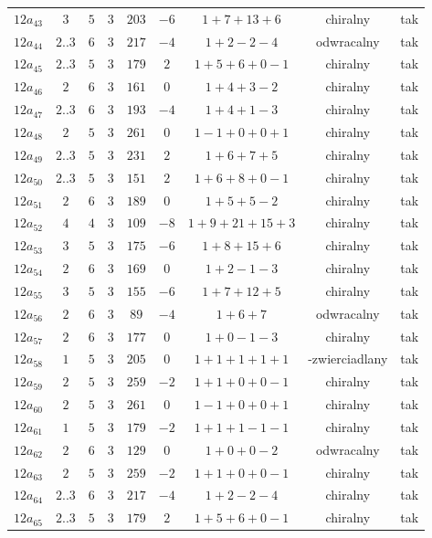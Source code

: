 \begin{longtable}{ccccccccc}
$12a_{43}$ & $3$ & $5$ & $3$ & $203$ & $-6$ & $1+7+13+6$ & chiralny & tak \\
$12a_{44}$ & $2..3$ & $6$ & $3$ & $217$ & $-4$ & $1+2-2-4$ & odwracalny & tak \\
$12a_{45}$ & $2..3$ & $5$ & $3$ & $179$ & $2$ & $1+5+6+0-1$ & chiralny & tak \\
$12a_{46}$ & $2$ & $6$ & $3$ & $161$ & $0$ & $1+4+3-2$ & chiralny & tak \\
$12a_{47}$ & $2..3$ & $6$ & $3$ & $193$ & $-4$ & $1+4+1-3$ & chiralny & tak \\
$12a_{48}$ & $2$ & $5$ & $3$ & $261$ & $0$ & $1-1+0+0+1$ & chiralny & tak \\
$12a_{49}$ & $2..3$ & $5$ & $3$ & $231$ & $2$ & $1+6+7+5$ & chiralny & tak \\
$12a_{50}$ & $2..3$ & $5$ & $3$ & $151$ & $2$ & $1+6+8+0-1$ & chiralny & tak \\
$12a_{51}$ & $2$ & $6$ & $3$ & $189$ & $0$ & $1+5+5-2$ & chiralny & tak \\
$12a_{52}$ & $4$ & $4$ & $3$ & $109$ & $-8$ & $1+9+21+15+3$ & chiralny & tak \\
$12a_{53}$ & $3$ & $5$ & $3$ & $175$ & $-6$ & $1+8+15+6$ & chiralny & tak \\
$12a_{54}$ & $2$ & $6$ & $3$ & $169$ & $0$ & $1+2-1-3$ & chiralny & tak \\
$12a_{55}$ & $3$ & $5$ & $3$ & $155$ & $-6$ & $1+7+12+5$ & chiralny & tak \\
$12a_{56}$ & $2$ & $6$ & $3$ & $89$ & $-4$ & $1+6+7$ & odwracalny & tak \\
$12a_{57}$ & $2$ & $6$ & $3$ & $177$ & $0$ & $1+0-1-3$ & chiralny & tak \\
$12a_{58}$ & $1$ & $5$ & $3$ & $205$ & $0$ & $1+1+1+1+1$ & -zwierciadlany & tak \\
$12a_{59}$ & $2$ & $5$ & $3$ & $259$ & $-2$ & $1+1+0+0-1$ & chiralny & tak \\
$12a_{60}$ & $2$ & $5$ & $3$ & $261$ & $0$ & $1-1+0+0+1$ & chiralny & tak \\
$12a_{61}$ & $1$ & $5$ & $3$ & $179$ & $-2$ & $1+1+1-1-1$ & chiralny & tak \\
$12a_{62}$ & $2$ & $6$ & $3$ & $129$ & $0$ & $1+0+0-2$ & odwracalny & tak \\
$12a_{63}$ & $2$ & $5$ & $3$ & $259$ & $-2$ & $1+1+0+0-1$ & chiralny & tak \\
$12a_{64}$ & $2..3$ & $6$ & $3$ & $217$ & $-4$ & $1+2-2-4$ & chiralny & tak \\
$12a_{65}$ & $2..3$ & $5$ & $3$ & $179$ & $2$ & $1+5+6+0-1$ & chiralny & tak \\

\end{longtable}
